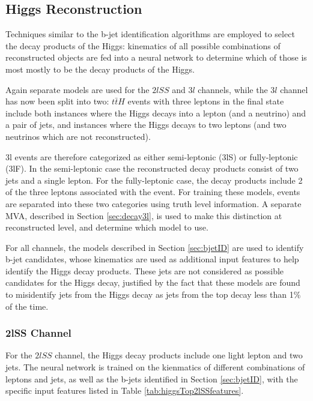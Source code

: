 \subsection{Higgs Reconstruction}
\label{sec:higgsID}

Techniques similar to the b-jet identification algorithms are employed to select the decay products of the Higgs: kinematics of all possible combinations of reconstructed objects are fed into a neural network to determine which of those is most mostly to be the decay products of the Higgs.

Again separate models are used for the $2lSS$ and $3l$  channels, while the $3l$  channel has now been split into two: $t\bar{t}H$ events with three leptons in the final state include both instances where the Higgs decays into a lepton (and a neutrino) and a pair of jets, and instances where the Higgs decays to two leptons (and two neutrinos which are not reconstructed).

3l events are therefore categorized as either semi-leptonic (3lS) or fully-leptonic (3lF). In the semi-leptonic case the reconstructed decay products consist of two jets and a single lepton. For the fully-leptonic case, the decay products include 2 of the three leptons associated with the event. For training these models, events are separated into these two categories using truth level information. A separate MVA, described in Section \ref{sec:decay3l}, is used to make this distinction at reconstructed level, and determine which model to use.

For all channels, the models described in Section \ref{sec:bjetID} are used to identify b-jet candidates, whose kinematics are used as additional input features to help identify the Higgs decay products. These jets are not considered as possible candidates for the Higgs decay, justified by the fact that these models are found to misidentify jets from the Higgs decay as jets from the top decay less than 1\% of the time.

\subsubsection{2lSS Channel}
\label{subsec:higgs2lSS}

For the $2lSS$ channel, the Higgs decay products include one light lepton and two jets. The neural network is trained on the kienmatics of different combinations of leptons and jets, as well as the b-jets identified in Section \ref{sec:bjetID}, with the specific input features listed in Table \ref{tab:higgsTop2lSSfeatures}.

